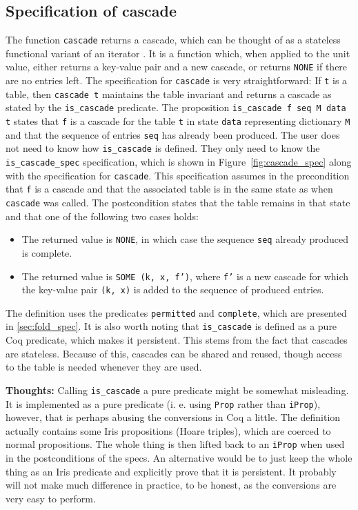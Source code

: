 \documentclass[10pt,a4paper]{article}
\renewcommand{\fcolorbox}[4][]{#4}}
\newcommand{\thoughts}[1]{\noindent\fcolorbox{black}{cyan}{\parbox{\textwidth}{\textbf{Thoughts:} \linebreak #1}}}
\begin{document}
\subsection{Specification of cascade}
The function \texttt{cascade} returns a cascade, which can be thought of as a stateless functional variant of an iterator \cite{Gamma:1995:DPE:186897}. It is a function which, when applied to the unit value, either returns a key-value pair and a new cascade, or returns \texttt{NONE} if there are no entries left. The specification for \texttt{cascade} is very straightforward: If \texttt{t} is a table, then \texttt{cascade t} maintains the table invariant and returns a cascade as stated by the \texttt{is\_cascade} predicate. The proposition \texttt{is\_cascade f seq M data t} states that \texttt{f} is a cascade for the table \texttt{t} in state \texttt{data} representing dictionary \texttt{M} and that the sequence of entries \texttt{seq} has already been produced. The user does not need to know how \texttt{is\_cascade} is defined. They only need to know the \texttt{is\_cascade\_spec} specification, which is shown in Figure~\ref{fig:cascade_spec} along with the specification for \texttt{cascade}. This specification assumes in the precondition that \texttt{f} is a cascade and that the associated table is in the same state as when \texttt{cascade} was called. The postcondition states that the table remains in that state and that one of the following two cases holds:
\begin{itemize}
\item The returned value is \texttt{NONE}, in which case the sequence \texttt{seq} already produced is complete.
\item The returned value is \texttt{SOME (k, x, f')}, where \texttt{f'} is a new cascade for which the key-value pair \texttt{(k, x)} is added to the sequence of produced entries.
\end{itemize}
The definition uses the predicates \texttt{permitted} and \texttt{complete}, which are presented in \ref{sec:fold_spec}. It is also worth noting that \texttt{is\_cascade} is defined as a pure Coq predicate, which makes it persistent. This stems from the fact that cascades are stateless. Because of this, cascades can be shared and reused, though access to the table is needed whenever they are used.

\thoughts{Calling \texttt{is\_cascade} a pure predicate might be somewhat misleading. It is implemented as a pure predicate (i. e. using \texttt{Prop} rather than \texttt{iProp}), however, that is perhaps abusing the conversions in Coq a little. The definition actually contains some Iris propositions (Hoare triples), which are coerced to normal propositions. The whole thing is then lifted back to an \texttt{iProp} when used in the postconditions of the specs. An alternative would be to just keep the whole thing as an Iris predicate and explicitly prove that it is persistent. It probably will not make much difference in practice, to be honest, as the conversions are very easy to perform.}
\end{document}
